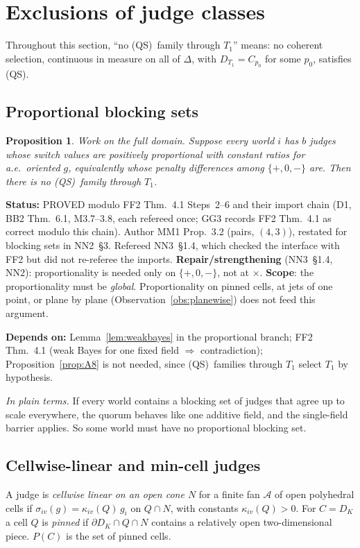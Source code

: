 \documentclass[11pt]{article}
\newtheorem{proposition}[theorem]{Proposition}
\theoremstyle{definition}
\theoremstyle{remark}
\newcommand{\src}[1]{\textsf{#1}}
\newcommand{\status}[1]{\par\smallskip\noindent\textbf{Status:} #1\par}
\newcommand{\deps}[1]{\noindent\textbf{Depends on:} #1\par}
\newcommand{\inwords}[1]{\noindent\textit{In plain terms.} #1\par\smallskip}
\newcommand{\QS}{\textup{(QS)}}
\begin{document}
\section{Exclusions of judge classes}\label{sec:exclusions}

Throughout this section, ``no \QS\ family through $T_1$'' means: no coherent selection, continuous in measure on all of $\Delta$, with $D_{T_1}=C_{p_0}$ for some $p_0$, satisfies \QS.

\subsection{Proportional blocking sets}
\begin{proposition}\label{prop:proportional}
Work on the full domain. Suppose every world $i$ has $b$ judges whose switch values are positively proportional with constant ratios for a.e.\ oriented $g$, equivalently whose penalty differences among $\{+,0,-\}$ are. Then there is no \QS\ family through $T_1$.
\end{proposition}
\status{PROVED modulo \src{FF2} Thm.~4.1 Steps~2--6 and their import chain (D1, BB2 Thm.~6.1, M3.7--3.8, each refereed once; GG3 records \src{FF2} Thm.~4.1 as correct modulo this chain). Author \src{MM1} Prop.~3.2 (pairs, $(4,3)$), restated for blocking sets in \src{NN2}~\S3. Refereed \src{NN3}~\S1.4, which checked the interface with \src{FF2} but did not re-referee the imports. \textbf{Repair/strengthening} (\src{NN3}~\S1.4, \src{NN2}): proportionality is needed only on $\{+,0,-\}$, not at $\times$. \textbf{Scope}: the proportionality must be \emph{global}. Proportionality on pinned cells, at jets of one point, or plane by plane (Observation~\ref{obs:planewise}) does not feed this argument.}
\deps{Lemma~\ref{lem:weakbayes} in the proportional branch; \src{FF2} Thm.~4.1 (weak Bayes for one fixed field $\Rightarrow$ contradiction); Proposition~\ref{prop:A8} is not needed, since \QS\ families through $T_1$ select $T_1$ by hypothesis.}
\inwords{If every world contains a blocking set of judges that agree up to scale everywhere, the quorum behaves like one additive field, and the single-field barrier applies. So some world must have no proportional blocking set.}

\subsection{Cellwise-linear and min-cell judges}\label{sec:mincell}
A judge is \emph{cellwise linear on an open cone $N$} for a finite fan $\mathcal A$ of open polyhedral cells if $\sigma_{iv}(g)=\kappa_{iv}(Q)\,g_i$ on $Q\cap N$, with constants $\kappa_{iv}(Q)>0$. For $C=D_K$ a cell $Q$ is \emph{pinned} if $\partial D_K\cap Q\cap N$ contains a relatively open two-dimensional piece. $P(C)$ is the set of pinned cells.
\end{document}
